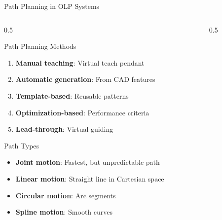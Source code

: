 \documentclass[10pt,aspectratio=169]{beamer}
\begin{document}
\begin{frame}{Path Planning in OLP Systems}
\begin{columns}[T]
\begin{column}{0.5\textwidth}
\begin{block}{Path Planning Methods}
\begin{enumerate}
\item \textbf{Manual teaching}: Virtual teach pendant
\item \textbf{Automatic generation}: From CAD features
\item \textbf{Template-based}: Reusable patterns
\item \textbf{Optimization-based}: Performance criteria
\item \textbf{Lead-through}: Virtual guiding
\end{enumerate}
\end{block}
\begin{alertblock}{Path Types}
\begin{itemize}
\item \textbf{Joint motion}: Fastest, but unpredictable path
\item \textbf{Linear motion}: Straight line in Cartesian space
\item \textbf{Circular motion}: Arc segments
\item \textbf{Spline motion}: Smooth curves
\end{itemize}
\end{alertblock}
\end{column}
\begin{column}{0.5\textwidth}
\begin{center}
\end{center}
\end{column}
\end{columns}


\end{frame}
\end{document}
